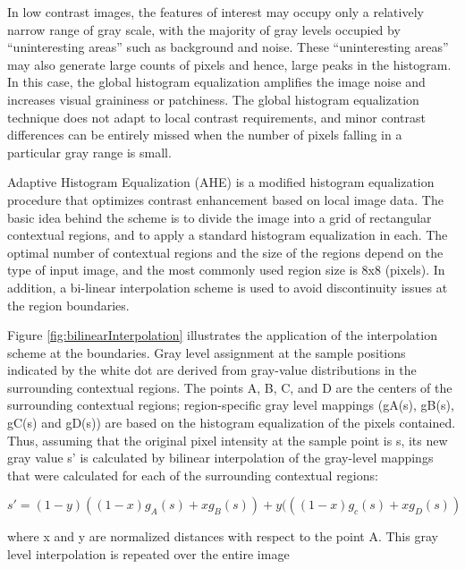 In low contrast images, the features of interest may occupy only a
relatively narrow range of gray scale, with the majority of gray levels occupied by
“uninteresting areas” such as background and noise. These “uninteresting areas”
may also generate large counts of pixels and hence, large peaks in the
histogram\cite{he2}. In this case, the global histogram equalization amplifies the image
noise and increases visual graininess or patchiness. The global histogram
equalization technique does not adapt to local contrast requirements, and minor
contrast differences can be entirely missed when the number of pixels falling in a
particular gray range is small\cite{he2}.

Adaptive Histogram Equalization (AHE) is a modified histogram
equalization procedure that optimizes contrast enhancement based on local
image data. The basic idea behind the scheme is to divide the image into a grid
of rectangular contextual regions, and to apply a standard histogram equalization
in each. The optimal number of contextual regions and the size of the regions
depend on the type of input image, and the most commonly used region size is
8x8 (pixels)\cite{he2}. In addition, a bi-linear interpolation scheme is used to avoid
discontinuity issues at the region boundaries\cite{he2}.

Figure \ref{fig:bilinearInterpolation} illustrates the application of the interpolation scheme at the
boundaries. Gray level assignment at the sample positions indicated by the white
dot are derived from gray-value distributions in the surrounding contextual regions\cite{he2}. The points A, B, C, and D are the centers of the surrounding contextual
regions; region-specific gray level mappings (gA(s), gB(s), gC(s) and gD(s)) are
based on the histogram equalization of the pixels contained. Thus, assuming that
the original pixel intensity at the sample point is s, its new gray value s’ is
calculated by bilinear interpolation of the gray-level mappings that were
calculated for each of the surrounding contextual regions:

\begin{equation}
	s'=(1-y)((1-x)g_{A}(s) + xg_{B}(s))+y(((1-x)g_{c}(s)+xg_{D}(s))
\end{equation}

where x and y are normalized distances with respect to the point A. This
gray level interpolation is repeated over the entire image

